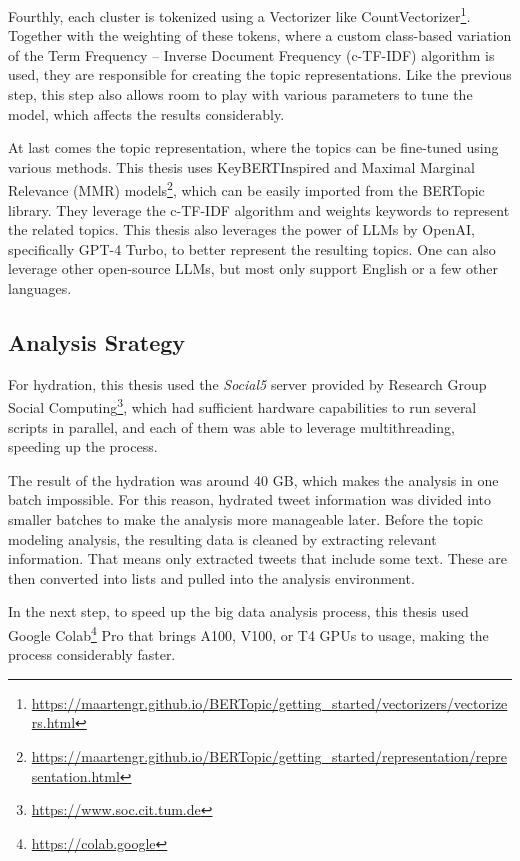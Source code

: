 Fourthly, each cluster is tokenized using a Vectorizer like 
CountVectorizer\footnote{\url{https://maartengr.github.io/BERTopic/getting_started/vectorizers/vectorizers.html}}. 
Together with the weighting of these tokens, where a custom 
class-based variation of the Term Frequency -- Inverse Document Frequency (c-TF-IDF) algorithm 
is used, they are responsible for creating the topic representations. 
Like the previous step, this step also allows room to play with various parameters 
to tune the model, which affects the results considerably.

At last comes the topic representation, where the topics can be fine-tuned 
using various methods. This thesis uses KeyBERTInspired and Maximal Marginal Relevance (MMR) 
models\footnote{\url{https://maartengr.github.io/BERTopic/getting_started/representation/representation.html}}, 
which can be easily imported from the BERTopic library. They leverage the c-TF-IDF algorithm 
and weights keywords to represent the related topics. 
This thesis also leverages the power of LLMs by OpenAI, specifically GPT-4 Turbo, 
to better represent the resulting topics. One can also leverage other open-source LLMs, 
but most only support English or a few other languages.

\subsection{Analysis Srategy}

For hydration, this thesis used the \textit{Social5} server provided by Research Group Social 
Computing\footnote{\url{https://www.soc.cit.tum.de}}, which had sufficient hardware 
capabilities to run several scripts in parallel, and each of them was able to leverage 
multithreading, speeding up the process.

The result of the hydration was around 40 GB, which makes the analysis in one batch impossible. 
For this reason, hydrated tweet information was divided into smaller batches to make the 
analysis more manageable later.
Before the topic modeling analysis, the resulting data is cleaned by extracting relevant 
information. That means only extracted tweets that include some text. These are then 
converted into lists and pulled into the analysis environment.

In the next step, to speed up the big data analysis process, this thesis used Google 
Colab\footnote{\url{https://colab.google}} Pro that brings A100, V100, or T4 GPUs to usage, 
making the process considerably faster. 

